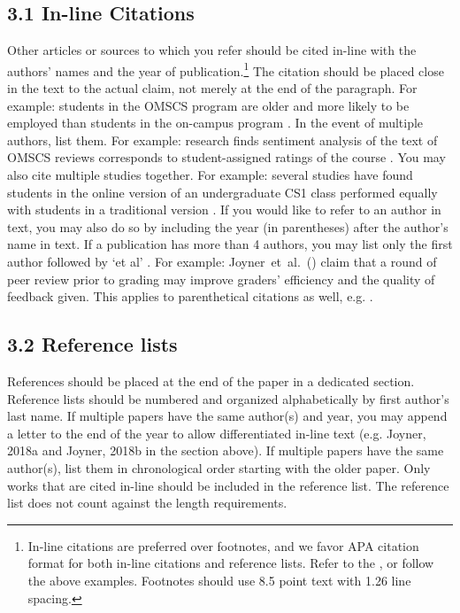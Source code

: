 {{{{\subsection*{3.1 In-line Citations}
Other articles or sources to which you refer should be cited in-line with the
authors' names and the year of publication.\footnote{In-line citations are preferred over footnotes, and we favor APA citation format for both in-line citations and reference lists. Refer to the , or follow the above examples. Footnotes should use 8.5 point text with 1.26 line spacing.
} The citation should be placed close
in the text to the actual claim, not merely at the end of the paragraph. For
example: students in the OMSCS program are older and more likely to be employed
than students in the on-campus program \citep{Joyner17}. In the event of
multiple authors, list them. For example: research finds sentiment analysis of
the text of OMSCS reviews corresponds to student-assigned ratings of the course
\citep{Newman18}. You may also cite multiple studies together. For example:
several studies have found students in the online version of an undergraduate
CS1 class performed equally with students in a traditional version
\citep{Joyner18a,Joyner18b,Joyner19}. If you would like to refer to an author in
text, you may also do so by including the year (in parentheses) after the
author's name in text. If a publication has more than 4 authors, you may list
only the first author followed by `et al' . For example:
Joyner~et~al.~(\citeyear{Joyner16}) claim that a round of peer review prior to
grading may improve graders' efficiency and the quality of feedback given. This
applies to parenthetical citations as well, e.g. \citep{Joyner16}.

\subsection*{3.2 Reference lists}
References should be placed at the end of the paper in a dedicated section. Reference lists should be numbered and organized alphabetically by first author’s last name. If multiple papers have the same author(s) and year, you may append a letter to the end of the year to allow differentiated in-line text (e.g. Joyner, 2018a and Joyner, 2018b in the section above). If multiple papers have the same author(s), list them in chronological order starting with the older paper. Only works that are cited in-line should be included in the reference list. The reference list does not count against the length requirements.

}}}}
